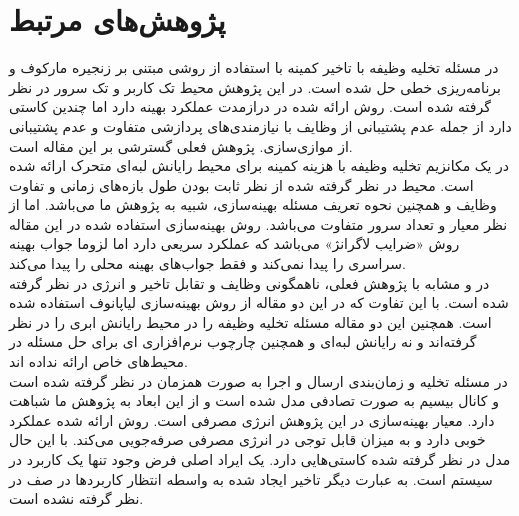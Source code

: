 \section{پژوهش‌های مرتبط}
در \cite{Liu} مسئله تخلیه وظیفه با تاخیر کمینه با استفاده از روشی مبتنی بر زنجیره مارکوف و برنامه‌ریزی خطی حل شده است. در این پژوهش محیط تک کاربر و تک سرور در نظر گرفته شده است. روش ارائه شده در درازمدت عملکرد بهینه دارد اما چندین کاستی دارد از جمله عدم پشتیبانی از وظایف با نیازمندی‌های پردازشی متفاوت و عدم پشتیبانی از موازی‌سازی. پژوهش فعلی گسترشی بر این مقاله است. \\

در \cite{samanta} یک مکانزیم تخلیه وظیفه با هزینه کمینه برای محیط رایانش لبه‌ای متحرک ارائه شده است. محیط در نظر گرفته شده از نظر ثابت بودن طول بازه‌های زمانی و تفاوت وظایف و همچنین نحوه تعریف مسئله بهینه‌سازی، شبیه به پژوهش ما می‌باشد. اما از نظر معیار و تعداد سرور متفاوت می‌باشد. روش بهینه‌سازی استفاده شده در این مقاله روش «ضرایب لاگرانژ» می‌باشد که عملکرد سریعی دارد اما لزوما جواب بهینه سراسری را پیدا نمی‌کند و فقط جواب‌های بهینه محلی را پیدا می‌کند. \\

در \cite{kwak} و \cite{jiang} مشابه با پژوهش فعلی، ناهمگونی وظایف و تقابل تاخیر و انرژی در نظر گرفته شده است. با این تفاوت که در این دو مقاله از روش بهینه‌سازی لیاپانوف استفاده شده است. همچنین این دو مقاله مسئله تخلیه وظیفه را در محیط رایانش ابری را در نظر گرفته‌اند و نه رایانش لبه‌ای و همچنین چارچوب نرم‌افزاری ای برای حل مسئله در محیط‌های خاص ارائه نداده اند. \\

در \cite{zhang2013} مسئله تخلیه و زمان‌بندی ارسال و اجرا به صورت همزمان در نظر گرفته شده است و کانال بیسیم به صورت تصادفی مدل شده است و از این ابعاد به پژوهش ما شباهت دارد. معیار بهینه‌سازی در این پژوهش انرژی مصرفی است. روش ارائه شده عملکرد خوبی دارد و به میزان قابل توجی در انرژی مصرفی صرفه‌جویی می‌کند. با این حال مدل در نظر گرفته شده کاستی‌هایی دارد. یک ایراد اصلی فرض وجود تنها یک کاربرد در سیستم است. به عبارت دیگر تاخیر ایجاد شده به واسطه انتظار کاربردها در صف در نظر گرفته نشده است.

\clearpage
